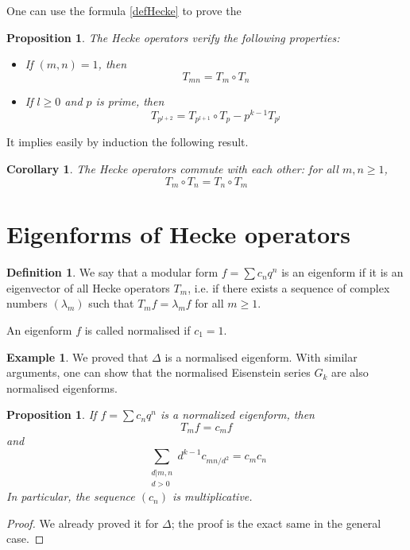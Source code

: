 \documentclass[12pt,a4paper,english]{article}
\theoremstyle{plain}
\newtheorem{prop}[thm]{Proposition}
\newtheorem{coro}[thm]{Corollary}
\theoremstyle{definition}
\newtheorem{defi}[thm]{Definition}
\newtheorem*{ex}{Example}
\begin{document}
One can use the formula \eqref{defHecke} to prove the

\begin{prop} 
The Hecke operators verify the following properties:
\begin{itemize}
    \item[i)] If $(m,n)=1$, then
\begin{equation*}
    T_{mn}=T_{m}\circ T_{n}
\end{equation*}
    \item[ii)] If $l\geqslant 0$ and $p$ is prime, then 
\begin{equation*}
    T_{p^{l+2}}=T_{p^{l+1}}\circ T_{p}-p^{k-1}T_{p^{l}}
\end{equation*}
\end{itemize}
\end{prop}

It implies easily by induction the following result.

\begin{coro}\label{Tmcommute}
The Hecke operators commute with each other: for all $m,n\geqslant 1$,
\begin{equation*}
    T_m\circ T_n=T_n\circ T_m
\end{equation*}
\end{coro}


\section{Eigenforms of Hecke operators}

\begin{defi}
We say that a modular form $f=\sum c_n q^n$ is an eigenform if it is an eigenvector of all Hecke operators $T_m$, i.e. if there exists a sequence of complex numbers $(\lambda_m)$ such that $T_m f=\lambda_m f$ for all $m\geqslant 1$.

An eigenform $f$ is called normalised if $c_1=1$.
\end{defi}

\begin{ex}
We proved that $\Delta$ is a normalised eigenform. With similar arguments, one can show that the normalised Eisenstein series $G_k$ are also normalised eigenforms.
\end{ex}

\begin{prop}\label{CoefEigen}
If $f=\sum c_n q^n$ is a normalized eigenform, then
\begin{equation*}
    T_mf=c_m f
\end{equation*}
and
\begin{equation}\label{EqCoefEigen}
    \sum_{\substack{d\vert m,n\\
                  d>0}}
        d^{k-1}c_{mn/d^2}=c_mc_n
\end{equation}
In particular, the sequence $(c_n)$ is multiplicative.
\end{prop}
\begin{proof}
We already proved it for $\Delta$; the proof is the exact same in the general case.
\end{proof}
\end{document}
